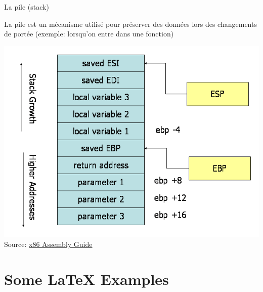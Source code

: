 \documentclass[10pt,xcolor={table,dvipsnames},t]{beamer}
\begin{document}
\begin{frame}{La pile (stack)}

La pile est un mécanisme utilisé pour préserver des données lors des changements de portée (exemple: lorsqu'on entre dans une fonction)

\begin{center}
\includegraphics[width=.60\textwidth,height=.56\textheight]{Stack-convention}\newline{}
Source: \href{https://www.cs.virginia.edu/~evans/cs216/guides/x86.html}{x86 Assembly Guide}
\end{center}

\end{frame}




\section{Some \LaTeX{} Examples}
\end{document}
